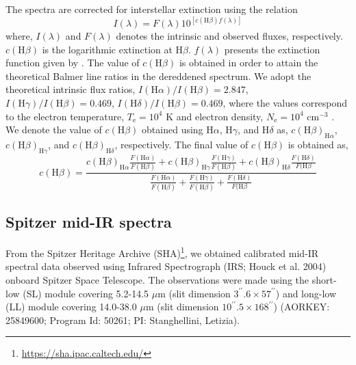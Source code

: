 \documentclass[a4paper,fleqn,usenatbib]{mnras}
\begin{document}
The spectra are corrected for interstellar extinction using the relation
\begin{equation}
I(\lambda)=F(\lambda)10^{[c(\mathrm{H}\beta)f(\lambda)]}
\end{equation}
where, $I(\lambda)$ and $F(\lambda)$ denotes the intrinsic and observed fluxes, respectively. $c(\mathrm{H}\beta)$ is the logarithmic extinction at H$\beta$. $f(\lambda)$ presents the extinction function given by \cite{1989ApJ...345..245C}. The value of $c(\mathrm{H}\beta)$ is obtained in order to attain the theoretical Balmer line ratios in the dereddened spectrum. We adopt the theoretical intrinsic flux ratios, $I(\mathrm{H}\alpha)/I(\mathrm{H}\beta)=2.847$, $I(\mathrm{H}\gamma)/I(\mathrm{H}\beta)=0.469$, $I(\mathrm{H}\delta)/I(\mathrm{H}\beta)=0.469$, where the values correspond to the electron temperature, $T_\mathrm{e}=10^4$ K and electron density, $N_\mathrm{e}=10^4$ cm$^{-3}$ \citep{2006agna.book.....O}. We denote the value of $c(\mathrm{H}\beta)$ obtained using H$\alpha$, H$\gamma$, and H$\delta$ as, $c(\mathrm{H}\beta)_{\mathrm{H}\alpha}$, $c(\mathrm{H}\beta)_{\mathrm{H}\gamma}$, and $c(\mathrm{H}\beta)_{\mathrm{H}\delta}$, respectively. The final value of $c(\mathrm{H}\beta)$ is obtained as, 
\begin{equation}
c(\mathrm{H}\beta)=\frac{{c(\mathrm{H}\beta)_{\mathrm{H}\alpha}}{\frac{F(\mathrm{H}\alpha)}{F(\mathrm{H}\beta)}} + {c(\mathrm{H}\beta)_{\mathrm{H}\gamma}}{\frac{F(\mathrm{H}\gamma)}{F(\mathrm{H}\beta)}} + {c(\mathrm{H}\beta)_{\mathrm{H}\delta}}{\frac{F(\mathrm{H}\delta)}{F(\mathrm{H}\beta}}}{\frac{F(\mathrm{H}\alpha)}{F(\mathrm{H}\beta)} + \frac{F(\mathrm{H}\gamma)}{F(\mathrm{H}\beta)} + \frac{F(\mathrm{H}\delta)}{F(\mathrm{H}\beta}}
\end{equation}            

\subsection{Spitzer mid-IR spectra} \label{sec:spitzer}

From the Spitzer Heritage Archive (SHA)\footnote{\url{https://sha.ipac.caltech.edu/}}, we obtained calibrated mid-IR spectral data observed using Infrared Spectrograph (IRS; Houck et al. 2004) onboard Spitzer Space Telescope. The observations were made using the short-low (SL) module covering 5.2-14.5 $\mu$m (slit dimension $3^{\prime\prime}.6\times57^{\prime\prime}$) and long-low (LL) module covering 14.0-38.0 $\mu$m (slit dimension $10^{\prime\prime}.5\times168^{\prime\prime}$) (AORKEY: 25849600; Program Id: 50261; PI: Stanghellini, Letizia). 
\end{document}
